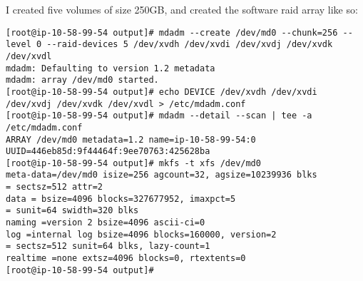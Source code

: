 I created five volumes of size 250GB, and created the software raid
array like so:

\begin{verbatim}
[root@ip-10-58-99-54 output]# mdadm --create /dev/md0 --chunk=256 --level 0 --raid-devices 5 /dev/xvdh /dev/xvdi /dev/xvdj /dev/xvdk /dev/xvdl
mdadm: Defaulting to version 1.2 metadata
mdadm: array /dev/md0 started.
[root@ip-10-58-99-54 output]# echo DEVICE /dev/xvdh /dev/xvdi /dev/xvdj /dev/xvdk /dev/xvdl > /etc/mdadm.conf
[root@ip-10-58-99-54 output]# mdadm --detail --scan | tee -a /etc/mdadm.conf
ARRAY /dev/md0 metadata=1.2 name=ip-10-58-99-54:0
UUID=446eb85d:9f44464f:9ee70763:425628ba
[root@ip-10-58-99-54 output]# mkfs -t xfs /dev/md0
meta-data=/dev/md0 isize=256 agcount=32, agsize=10239936 blks
= sectsz=512 attr=2
data = bsize=4096 blocks=327677952, imaxpct=5
= sunit=64 swidth=320 blks
naming =version 2 bsize=4096 ascii-ci=0
log =internal log bsize=4096 blocks=160000, version=2
= sectsz=512 sunit=64 blks, lazy-count=1
realtime =none extsz=4096 blocks=0, rtextents=0
[root@ip-10-58-99-54 output]#
\end{verbatim}

